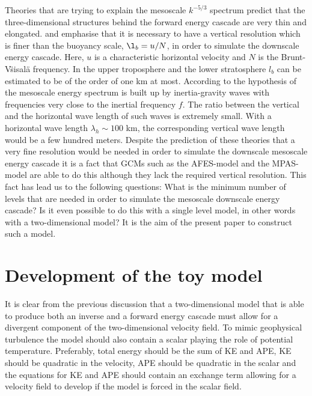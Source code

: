 Theories that are trying to explain the mesoscale $ k^{-5/3} $ spectrum predict that the three-dimensional structures behind the forward energy cascade are very thin and elongated. \citet{Lindborg2006} and 
\citet{Waite-Bartello:2004}  emphasise that  it is necessary to have a vertical resolution which is finer than the buoyancy scale, $ \l_b= u/N $, in order to simulate the downscale energy cascade. Here, $ u $ is a characteristic horizontal velocity and $ N $ is the Brunt-V\"sisal\"a frequency. In the upper troposphere and the lower stratosphere $ l_b $ can be estimated to be of the order of one km at most.  According to the hypothesis  of \citet{Callies-Buhler-Ferrari:2016} the mesoscale energy spectrum is built up by inertia-gravity waves with frequencies very close to the inertial frequency $ f $. The ratio between the vertical and the horizontal wave length of such waves is extremely small. With a horizontal wave length $ \lambda_{h} \sim 100 $ km, the corresponding vertical wave length would be a few hundred meters. Despite the prediction of these theories that a very fine resolution would be needed in order to simulate the downscale mesoscale energy cascade it is a fact that GCMs such as the AFES-model and the MPAS-model \citep{Skamarock-Park-Klemp-Snyder:2014} are able to do this although they lack the required vertical resolution. This fact has lead us to the following questions: What is the minimum number of levels that are needed in order to simulate the mesoscale downscale energy cascade? Is it even possible to do this with a single level model, in other words with a two-dimensional model? It is the aim of the present paper to construct such a model.

\section{Development of the toy model}
It is clear from the previous discussion that  a  two-dimensional model that is able to produce both an inverse and a forward energy  cascade must allow for a divergent component of the two-dimensional velocity field. 
To mimic geophysical turbulence the model should also contain a scalar playing the role of potential temperature. Preferably, total energy should be the sum of KE and APE, KE should be quadratic in the velocity, APE should be quadratic in the scalar and the equations for KE and APE should contain an exchange term allowing for a velocity field to develop if the model is forced in the scalar field. 

